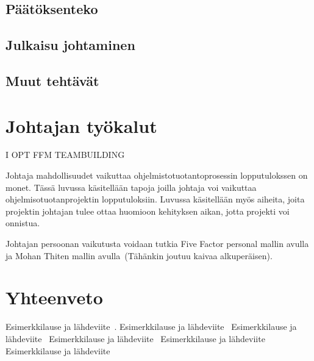 \documentclass[finnish]{tktltiki2}
\theoremstyle{definition}
\theoremstyle{remark}
\begin{document}
\subsection{Päätöksenteko}

\subsection{Julkaisu johtaminen}

\subsection{Muut tehtävät}

\section{Johtajan työkalut}

I OPT
FFM
TEAMBUILDING

Johtaja mahdollisuudet vaikuttaa ohjelmistotuotantoprosessin lopputulokssen on monet. Tässä luvussa käsitellään tapoja joilla johtaja voi vaikuttaa ohjelmisotuotanprojektin lopputuloksiin. Luvussa käsitellään myös aiheita, joita projektin johtajan tulee ottaa huomioon kehityksen aikan, jotta projekti voi onnistua. 

Johtajan persoonan vaikutusta voidaan tutkia Five Factor personal mallin avulla ja Mohan Thiten mallin avulla~\cite{Wang:2009:PMP:1639950.1640049}(Tähänkin joutuu kaivaa alkuperäisen). 


\section{Yhteenveto}







 




Esimerkkilause ja lähdeviite~\cite{Guo:2008:SSP:1414004.1414046}.
Esimerkkilause ja lähdeviite~\cite{Zhang:2011:ECL:2047594.2047666}
Esimerkkilause ja lähdeviite~\cite{Dhomne:2012:ITL:2382887.2382899}
Esimerkkilause ja lähdeviite~\cite{bahli2005group}
Esimerkkilause ja lähdeviite~\cite{Augustine:2005:APM:1101779.1101781}
Esimerkkilause ja lähdeviite~\cite{Chow2008961}





%

%
% 
%



\end{document}
